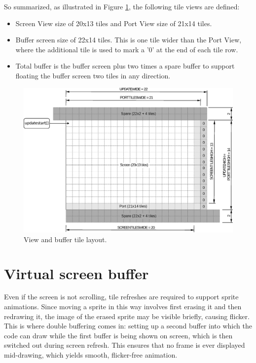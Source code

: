 \documentclass[book.tex]{subfiles}
\begin{document}
So summarized, as illustrated in Figure \ref{fig:screen_setup}, the following tile views are defined:
\begin{itemize}
\item Screen View size of 20x13 tiles and Port View size of 21x14 tiles.
\item Buffer screen size of 22x14 tiles. This is one tile wider than the Port View, where the additional tile is used to mark a '0' at the end of each tile row. 
\item Total buffer is the buffer screen plus two times a spare buffer to support floating the buffer screen two tiles in any direction.
\end{itemize}
\par
 
\begin{figure}[H]
\centering
\includegraphics[width=\textwidth]{imgs/drawings/buffer_tile_layout.eps}
\caption{View and buffer tile layout.}
\label{fig:screen_setup}
\end{figure}



\section{Virtual screen buffer}
Even if the screen is not scrolling, tile refreshes are required to support sprite animations. Since moving a sprite in this way involves first erasing it and then redrawing it, the image of the erased sprite may be visible briefly, causing flicker. This is where double buffering comes in: setting up a second buffer into which the code can draw while the first buffer is being shown on screen, which is then switched out during screen refresh. This ensures that no frame is ever displayed mid-drawing, which yields smooth, flicker-free animation.\\
\end{document}
